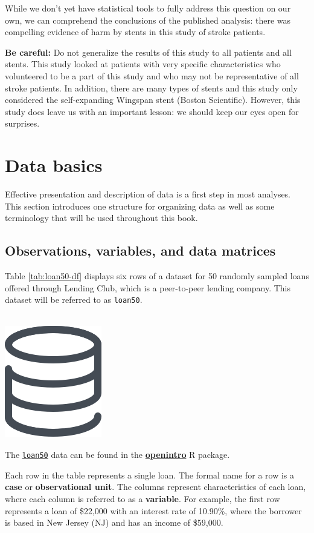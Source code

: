 \documentclass[
  10pt,
  openany]{book}
\newenvironment{mdframedwithfootTipDataPro}
{   
    \savenotes
    \begin{mdframed}[%
    topline=true, bottomline=true, linecolor=oiGray, linewidth=0.5pt,
    rightline=false, leftline=false,
    backgroundcolor=oiLGray]
    \renewcommand{\thempfootnote}{\arabic{footnote}}
    }
{
    \end{mdframed}
    \spewnotes
}
\newenvironment{data}{
\vspace{4mm}
\begin{mdframedwithfootTipDataPro}
\begin{minipage}[t]{0.10\textwidth}
{$\:$ \\ \setkeys{Gin}{width=2em,keepaspectratio}\includegraphics{images/_icons/data.png}}
\end{minipage}
\hfill
\begin{minipage}[t]{0.90\textwidth}
\vspace{-2mm}
\setlength{\parskip}{1em}
}{\end{minipage}
\end{mdframedwithfootTipDataPro}
\vspace{4mm}
}
\begin{document}
While we don't yet have statistical tools to fully address this question on our own, we can comprehend the conclusions of the published analysis: there was compelling evidence of harm by stents in this study of stroke patients.

\textbf{Be careful:} Do not generalize the results of this study to all patients and all stents.
This study looked at patients with very specific characteristics who volunteered to be a part of this study and who may not be representative of all stroke patients.
In addition, there are many types of stents and this study only considered the self-expanding Wingspan stent (Boston Scientific).
However, this study does leave us with an important lesson: we should keep our eyes open for surprises.

\hypertarget{data-basics}{%
\section{Data basics}\label{data-basics}}

Effective presentation and description of data is a first step in most analyses.
This section introduces one structure for organizing data as well as some terminology that will be used throughout this book.

\hypertarget{observations-variables-and-data-matrices}{%
\subsection{Observations, variables, and data matrices}\label{observations-variables-and-data-matrices}}

Table \ref{tab:loan50-df} displays six rows of a dataset for 50 randomly sampled loans offered through Lending Club, which is a peer-to-peer lending company.
This dataset will be referred to as \texttt{loan50}.

\begin{data}
The \href{http://openintrostat.github.io/openintro/reference/loans_full_schema.html}{\texttt{loan50}} data can be found in the \href{http://openintrostat.github.io/openintro}{\textbf{openintro}} R package.

\end{data}

Each row in the table represents a single loan.
The formal name for a row is a \textbf{case} or \textbf{observational unit}.
The columns represent characteristics of each loan, where each column is referred to as a \textbf{variable}.
For example, the first row represents a loan of \$22,000 with an interest rate of 10.90\%, where the borrower is based in New Jersey (NJ) and has an income of \$59,000.
\end{document}
